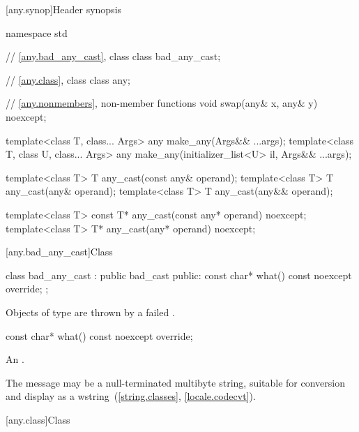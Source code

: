 [any.synop]{Header  synopsis}

%

\begin{codeblock}
namespace std {
  // \ref{any.bad_any_cast}, class 
  class bad_any_cast;

  // \ref{any.class}, class 
  class any;

  // \ref{any.nonmembers}, non-member functions
  void swap(any& x, any& y) noexcept;

  template<class T, class... Args>
    any make_any(Args&& ...args);
  template<class T, class U, class... Args>
    any make_any(initializer_list<U> il, Args&& ...args);

  template<class T>
    T any_cast(const any& operand);
  template<class T>
    T any_cast(any& operand);
  template<class T>
    T any_cast(any&& operand);

  template<class T>
    const T* any_cast(const any* operand) noexcept;
  template<class T>
    T* any_cast(any* operand) noexcept;
}
\end{codeblock}

[any.bad_any_cast]{Class }

%
\begin{codeblock}
class bad_any_cast : public bad_cast {
public:
  const char* what() const noexcept override;
};
\end{codeblock}

\pnum
Objects of type  are thrown by a failed .

%
\begin{itemdecl}
const char* what() const noexcept override;
\end{itemdecl}

\begin{itemdescr}
\pnum
\returns An  \ntbs{}.

\pnum
\remarks
The message may be a null-terminated multibyte string,
suitable for conversion and display as a wstring~(\ref{string.classes}, \ref{locale.codecvt}).
\end{itemdescr}

[any.class]{Class }

